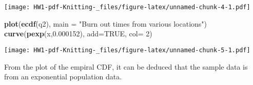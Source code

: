 \documentclass[]{article}
\newenvironment{Shaded}{\begin{snugshade}}{\end{snugshade}}
\newcommand{\DataTypeTok}[1]{\textcolor[rgb]{0.13,0.29,0.53}{#1}}
\newcommand{\DecValTok}[1]{\textcolor[rgb]{0.00,0.00,0.81}{#1}}
\newcommand{\FloatTok}[1]{\textcolor[rgb]{0.00,0.00,0.81}{#1}}
\newcommand{\KeywordTok}[1]{\textcolor[rgb]{0.13,0.29,0.53}{\textbf{#1}}}
\newcommand{\NormalTok}[1]{#1}
\newcommand{\OtherTok}[1]{\textcolor[rgb]{0.56,0.35,0.01}{#1}}
\newcommand{\StringTok}[1]{\textcolor[rgb]{0.31,0.60,0.02}{#1}}
\begin{document}
\texttt{[image: HW1-pdf-Knitting-\_files/figure-latex/unnamed-chunk-4-1.pdf]}

\begin{Shaded}
\begin{Highlighting}[]
\KeywordTok{plot}\NormalTok{(}\KeywordTok{ecdf}\NormalTok{(q2), }\DataTypeTok{main =} \StringTok{"Burn out times from various locations"}\NormalTok{)}
\KeywordTok{curve}\NormalTok{(}\KeywordTok{pexp}\NormalTok{(x,}\FloatTok{0.000152}\NormalTok{), }\DataTypeTok{add=}\OtherTok{TRUE}\NormalTok{, }\DataTypeTok{col=} \DecValTok{2}\NormalTok{)}
\end{Highlighting}
\end{Shaded}

\texttt{[image: HW1-pdf-Knitting-\_files/figure-latex/unnamed-chunk-5-1.pdf]}

From the plot of the empiral CDF, it can be deduced that the sample data
is from an exponential population data.
\end{document}
